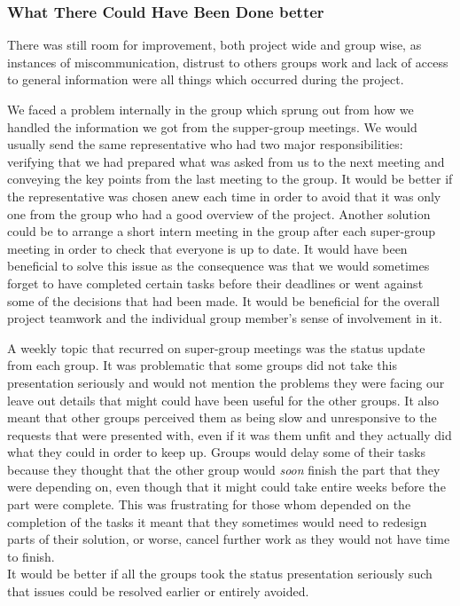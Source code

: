 \subsubsection*{What There Could Have Been Done better}
There was still room for improvement, both project wide and group wise, as instances of miscommunication, distrust to others groups work and lack of access to general information were all things %
 which occurred during the project.

We faced a problem internally in the group which sprung out from how we handled the information we got from the supper-group meetings. We would usually send the same representative who had two major responsibilities: verifying that we had prepared what was asked from us to the next meeting and conveying the key points from the last meeting to the group. It would be better if the representative was chosen anew each time in order to avoid that it was only one from the group who had a good overview of the project. Another solution could be to arrange a short intern meeting in the group after each super-group meeting in order to check that everyone is up to date. It would have been beneficial to solve this issue as the consequence was that we would sometimes forget to have completed certain tasks before their deadlines or went against some of the decisions that had been made. It would be beneficial for the overall project teamwork and the individual group member's sense of involvement in it.

A weekly topic that recurred on super-group meetings was the status update from each group. It was problematic that some groups did not take this presentation seriously and would not mention the problems they were facing our leave out details that might could have been useful for the other groups. It also meant that other groups perceived them as being slow and unresponsive to the requests that were presented with, even if it was them unfit and they actually did what they could in order to keep up. Groups would delay some of their tasks because they thought that the other group would \textit{soon} finish the part that they were depending on, even though that it might could take entire weeks before the part were complete. This was frustrating for those whom depended on the completion of the tasks it meant that they sometimes would need to redesign parts of their solution, or worse, cancel further work as they would not have time to finish. \\
It would be better if all the groups took the status presentation seriously such that issues could be resolved earlier or entirely avoided. %


